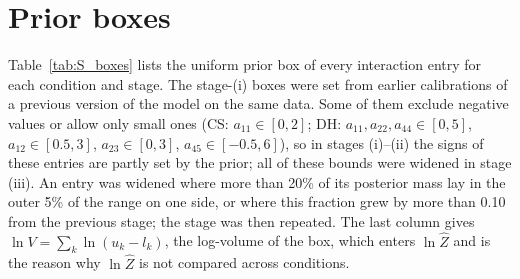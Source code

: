 \documentclass[11pt,a4paper]{article}
\newcommand{\suppdir}{figures/raw/supp}%
\begin{document}
\section{Prior boxes}
\label{sec:S_boxes}
Table~\ref{tab:S_boxes} lists the uniform prior box of every interaction entry for each condition and stage.
The stage-(i) boxes were set from earlier calibrations of a previous version of the model on the same data.
Some of them exclude negative values or allow only small ones (CS: $a_{11}\in[0,2]$; DH: $a_{11},a_{22},a_{44}\in[0,5]$, $a_{12}\in[0.5,3]$, $a_{23}\in[0,3]$, $a_{45}\in[-0.5,6]$), so in stages (i)--(ii) the signs of these entries are partly set by the prior; all of these bounds were widened in stage (iii).
An entry was widened where more than 20\% of its posterior mass lay in the outer 5\% of the range on one side, or where this fraction grew by more than 0.10 from the previous stage; the stage was then repeated.
The last column gives $\ln V=\sum_k\ln(u_k-l_k)$, the log-volume of the box, which enters $\ln\hat Z$ and is the reason why $\ln\hat Z$ is not compared across conditions.

\begin{table}[h]
\centering
\caption{Prior boxes per condition and stage for the 15 free entries. (i)~initial box; (ii)~stage-(i) posterior mean $\pm4$\,SD; (iii)~back on the box of stage~(i), with the bounds widened (bold) where more than 20\% of the posterior mass lay in the outer 5\% on one side; (iv)~stage-(iii) posterior mean $\pm4$\,SD, clipped to the stage-(iii) box (seed with the highest log-likelihood). $\ln V=\sum_k\ln(u_k-l_k)$ over the free entries. }
\label{tab:S_boxes}

\end{table}
\end{document}
